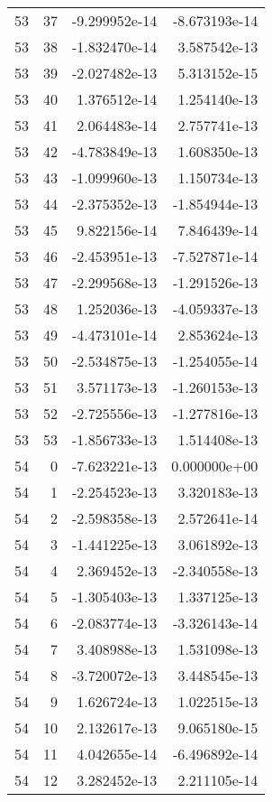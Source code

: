 \begin{tabular}{rrrr}
  53 &   37 & -9.299952e-14 & -8.673193e-14 \\
  53 &   38 & -1.832470e-14 &  3.587542e-13 \\
  53 &   39 & -2.027482e-13 &  5.313152e-15 \\
  53 &   40 &  1.376512e-14 &  1.254140e-13 \\
  53 &   41 &  2.064483e-14 &  2.757741e-13 \\
  53 &   42 & -4.783849e-13 &  1.608350e-13 \\
  53 &   43 & -1.099960e-13 &  1.150734e-13 \\
  53 &   44 & -2.375352e-13 & -1.854944e-13 \\
  53 &   45 &  9.822156e-14 &  7.846439e-14 \\
  53 &   46 & -2.453951e-13 & -7.527871e-14 \\
  53 &   47 & -2.299568e-13 & -1.291526e-13 \\
  53 &   48 &  1.252036e-13 & -4.059337e-13 \\
  53 &   49 & -4.473101e-14 &  2.853624e-13 \\
  53 &   50 & -2.534875e-13 & -1.254055e-14 \\
  53 &   51 &  3.571173e-13 & -1.260153e-13 \\
  53 &   52 & -2.725556e-13 & -1.277816e-13 \\
  53 &   53 & -1.856733e-13 &  1.514408e-13 \\
  54 &    0 & -7.623221e-13 &  0.000000e+00 \\
  54 &    1 & -2.254523e-13 &  3.320183e-13 \\
  54 &    2 & -2.598358e-13 &  2.572641e-14 \\
  54 &    3 & -1.441225e-13 &  3.061892e-13 \\
  54 &    4 &  2.369452e-13 & -2.340558e-13 \\
  54 &    5 & -1.305403e-13 &  1.337125e-13 \\
  54 &    6 & -2.083774e-13 & -3.326143e-14 \\
  54 &    7 &  3.408988e-13 &  1.531098e-13 \\
  54 &    8 & -3.720072e-13 &  3.448545e-13 \\
  54 &    9 &  1.626724e-13 &  1.022515e-13 \\
  54 &   10 &  2.132617e-13 &  9.065180e-15 \\
  54 &   11 &  4.042655e-14 & -6.496892e-14 \\
  54 &   12 &  3.282452e-13 &  2.211105e-14 \\

\end{tabular}
